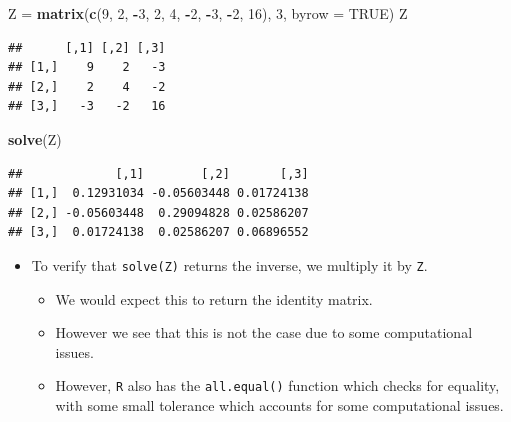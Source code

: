 \documentclass[]{book}
\newenvironment{Shaded}{\begin{snugshade}}{\end{snugshade}}
\newcommand{\KeywordTok}[1]{\textcolor[rgb]{0.13,0.29,0.53}{\textbf{#1}}}
\newcommand{\DataTypeTok}[1]{\textcolor[rgb]{0.13,0.29,0.53}{#1}}
\newcommand{\DecValTok}[1]{\textcolor[rgb]{0.00,0.00,0.81}{#1}}
\newcommand{\StringTok}[1]{\textcolor[rgb]{0.31,0.60,0.02}{#1}}
\newcommand{\OtherTok}[1]{\textcolor[rgb]{0.56,0.35,0.01}{#1}}
\newcommand{\OperatorTok}[1]{\textcolor[rgb]{0.81,0.36,0.00}{\textbf{#1}}}
\newcommand{\NormalTok}[1]{#1}
\providecommand{\tightlist}{%
  \setlength{\itemsep}{0pt}\setlength{\parskip}{0pt}}
\begin{document}
\begin{Shaded}
\begin{Highlighting}[]
\NormalTok{Z =}\StringTok{ }\KeywordTok{matrix}\NormalTok{(}\KeywordTok{c}\NormalTok{(}\DecValTok{9}\NormalTok{, }\DecValTok{2}\NormalTok{, }\OperatorTok{-}\DecValTok{3}\NormalTok{, }\DecValTok{2}\NormalTok{, }\DecValTok{4}\NormalTok{, }\OperatorTok{-}\DecValTok{2}\NormalTok{, }\OperatorTok{-}\DecValTok{3}\NormalTok{, }\OperatorTok{-}\DecValTok{2}\NormalTok{, }\DecValTok{16}\NormalTok{), }\DecValTok{3}\NormalTok{, }\DataTypeTok{byrow =} \OtherTok{TRUE}\NormalTok{)}
\NormalTok{Z}
\end{Highlighting}
\end{Shaded}

\begin{verbatim}
##      [,1] [,2] [,3]
## [1,]    9    2   -3
## [2,]    2    4   -2
## [3,]   -3   -2   16
\end{verbatim}

\begin{Shaded}
\begin{Highlighting}[]
\KeywordTok{solve}\NormalTok{(Z)}
\end{Highlighting}
\end{Shaded}

\begin{verbatim}
##             [,1]        [,2]       [,3]
## [1,]  0.12931034 -0.05603448 0.01724138
## [2,] -0.05603448  0.29094828 0.02586207
## [3,]  0.01724138  0.02586207 0.06896552
\end{verbatim}

\begin{itemize}
\tightlist
\item
  To verify that \texttt{solve(Z)} returns the inverse, we multiply it
  by \texttt{Z}.

  \begin{itemize}
  \tightlist
  \item
    We would expect this to return the identity matrix.
  \item
    However we see that this is not the case due to some computational
    issues.
  \item
    However, \texttt{R} also has the \texttt{all.equal()} function which
    checks for equality, with some small tolerance which accounts for
    some computational issues.
  \end{itemize}
\end{itemize}

\begin{Shaded}
\end{Shaded}
\end{document}
